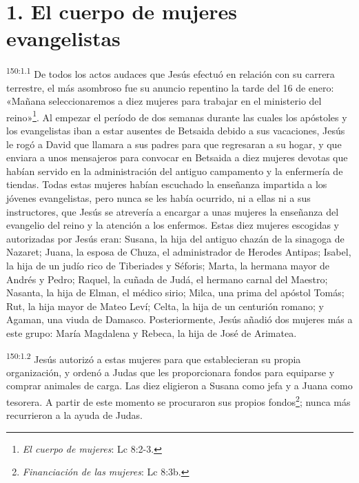\section*{1. El cuerpo de mujeres evangelistas}
\par 
\textsuperscript{150:1.1} De todos los actos audaces que Jesús efectuó en relación con su carrera terrestre, el más asombroso fue su anuncio repentino la tarde del 16 de enero: «Mañana seleccionaremos a diez mujeres para trabajar en el ministerio del reino»\footnote{\textit{El cuerpo de mujeres}: Lc 8:2-3.}. Al empezar el período de dos semanas durante las cuales los apóstoles y los evangelistas iban a estar ausentes de Betsaida debido a sus vacaciones, Jesús le rogó a David que llamara a sus padres para que regresaran a su hogar, y que enviara a unos mensajeros para convocar en Betsaida a diez mujeres devotas que habían servido en la administración del antiguo campamento y la enfermería de tiendas. Todas estas mujeres habían escuchado la enseñanza impartida a los jóvenes evangelistas, pero nunca se les había ocurrido, ni a ellas ni a sus instructores, que Jesús se atrevería a encargar a unas mujeres la enseñanza del evangelio del reino y la atención a los enfermos. Estas diez mujeres escogidas y autorizadas por Jesús eran: Susana, la hija del antiguo chazán de la sinagoga de Nazaret; Juana, la esposa de Chuza, el administrador de Herodes Antipas; Isabel, la hija de un judío rico de Tiberiades y Séforis; Marta, la hermana mayor de Andrés y Pedro; Raquel, la cuñada de Judá, el hermano carnal del Maestro; Nasanta, la hija de Elman, el médico sirio; Milca, una prima del apóstol Tomás; Rut, la hija mayor de Mateo Leví; Celta, la hija de un centurión romano; y Agaman, una viuda de Damasco. Posteriormente, Jesús añadió dos mujeres más a este grupo: María Magdalena y Rebeca, la hija de José de Arimatea.

\par 
\textsuperscript{150:1.2} Jesús autorizó a estas mujeres para que establecieran su propia organización, y ordenó a Judas que les proporcionara fondos para equiparse y comprar animales de carga. Las diez eligieron a Susana como jefa y a Juana como tesorera. A partir de este momento se procuraron sus propios fondos\footnote{\textit{Financiación de las mujeres}: Lc 8:3b.}; nunca más recurrieron a la ayuda de Judas.

